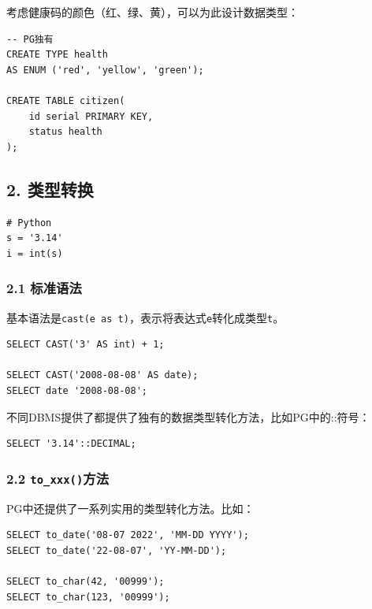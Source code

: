 \documentclass[aspectratio=169, 14pt]{beamer}
\begin{document}
\begin{frame}[fragile]
考虑健康码的颜色（红、绿、黄），可以为此设计数据类型：

\begin{verbatim}
-- PG独有
CREATE TYPE health
AS ENUM ('red', 'yellow', 'green');

CREATE TABLE citizen(
    id serial PRIMARY KEY,
    status health
);
\end{verbatim}

\end{frame}

\begin{frame}[fragile]
    \section{\textcolor{darkmidnightblue}{2. 类型转换}}
    \begin{verbatim}
# Python
s = '3.14'
i = int(s)
    \end{verbatim}
\end{frame}

\begin{frame}[fragile]
    \frametitle{2.1 标准语法}
基本语法是\alert{\texttt{cast(e as t)}}，表示将表达式\texttt{e}转化成类型\texttt{t}。   

\begin{verbatim}
SELECT CAST('3' AS int) + 1;

SELECT CAST('2008-08-08' AS date);
SELECT date '2008-08-08';
\end{verbatim}
\pause
不同DBMS提供了都提供了独有的数据类型转化方法，比如PG中的\alert{::}符号：
\begin{verbatim}
SELECT '3.14'::DECIMAL;
\end{verbatim}

\end{frame}

\begin{frame}[fragile]
    \frametitle{2.2 \texttt{to\_xxx()}方法}
PG中还提供了一系列实用的类型转化方法。比如：

\begin{verbatim}
SELECT to_date('08-07 2022', 'MM-DD YYYY');
SELECT to_date('22-08-07', 'YY-MM-DD');

SELECT to_char(42, '00999');
SELECT to_char(123, '00999');
\end{verbatim}

\end{frame}
\end{document}
